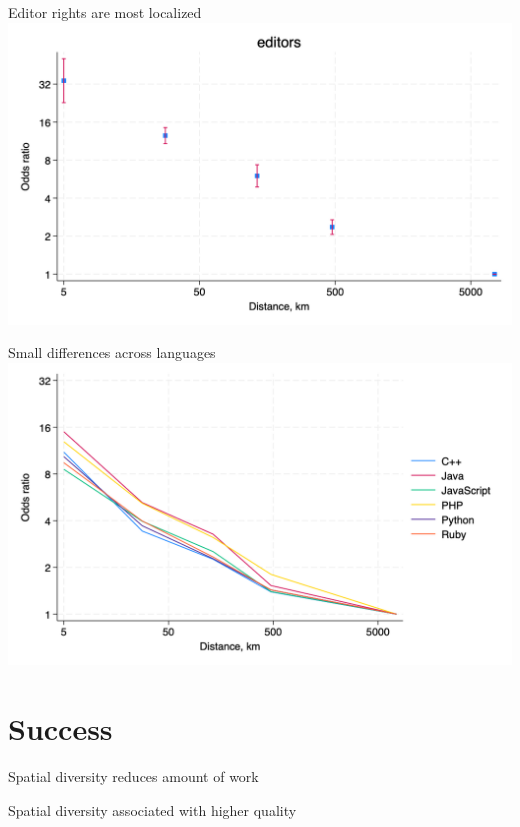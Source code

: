 \documentclass[
  ignorenonframetext,
  aspectratio=1610,
]{beamer}
\begin{document}
\begin{frame}{Editor rights are most localized}
\protect\hypertarget{editor-rights-are-most-localized}{}
\includegraphics{figures/editors_gravity.png}
\end{frame}

\begin{frame}{Small differences across languages}
\protect\hypertarget{small-differences-across-languages}{}
\includegraphics{figures/commits_by_language.png}
\end{frame}

\section{Success}\label{success}

\begin{frame}{Spatial diversity reduces amount of work}
\protect\hypertarget{spatial-diversity-reduces-amount-of-work}{}
\hspace*{-2em}
\end{frame}

\begin{frame}{Spatial diversity associated with higher quality}
\protect\hypertarget{spatial-diversity-associated-with-higher-quality}{}
\hspace*{-2em}
\end{frame}
\end{document}
